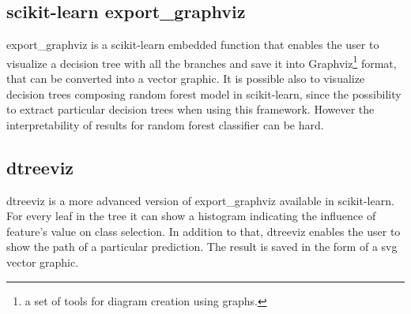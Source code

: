 \subsection{scikit-learn export\_graphviz}
export\_graphviz is a scikit-learn embedded function that enables the user to visualize a decision tree with all the branches and save it into Graphviz\footnote{a set of tools for diagram creation using graphs.} format, that can be converted into a vector graphic. It is possible also to visualize decision trees composing random forest model in scikit-learn, since the possibility to extract particular decision trees when using this framework. However the interpretability of results for random forest classifier can be hard.

\subsection{dtreeviz}
dtreeviz is a more advanced version of export\_graphviz available in scikit-learn. For every leaf in the tree it can show a histogram indicating the influence of feature's value on class selection. In addition to that, dtreeviz enables the user to show the path of a particular prediction. The result is saved in the form of a svg vector graphic. 




